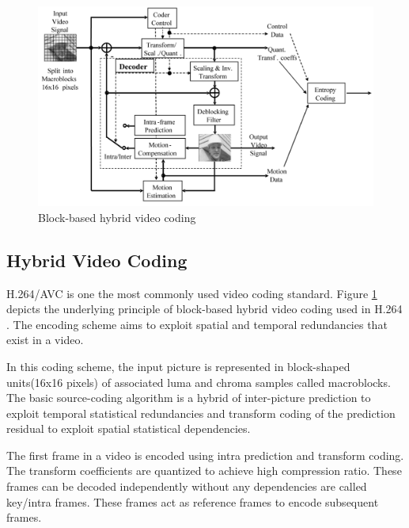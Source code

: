 \documentclass[11pt]{article} %
\begin{document}
\begin{figure}[h]
	\centering
	\includegraphics[scale=0.5]{general/Hybrid_video_coding.png}
	\caption{Block-based hybrid video coding}
	\label{fig:Hybrid Video Coding}
\end{figure}

\subsection{Hybrid Video Coding}
H.264/AVC is one the most commonly used video coding standard. Figure \ref{fig:Hybrid Video Coding} depicts the underlying principle of block-based hybrid video coding used in H.264 \cite{h.264-overview}. The encoding scheme aims to exploit spatial and temporal redundancies that exist in a video. 


In this coding scheme, the input picture is represented in block-shaped units(16x16 pixels) of associated luma and chroma samples called macroblocks. The basic source-coding algorithm is a hybrid of inter-picture prediction to exploit temporal statistical redundancies and transform coding of the prediction residual to exploit spatial statistical dependencies. 

The first frame in a video is encoded using intra prediction and transform coding. The transform coefficients are quantized to achieve high compression ratio. These frames can be decoded independently without any dependencies are called key/intra frames. These frames act as reference frames to encode subsequent frames.
\end{document}
